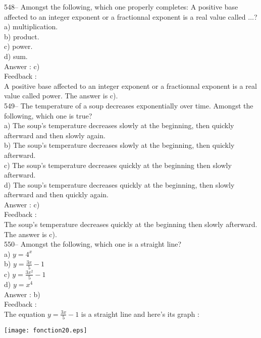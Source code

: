 \documentclass[letterpaper, 12pt]{article}
\begin{document}
548-- Amongst the following, which one properly completes: \og A positive base affected to an integer exponent or a fractionnal exponent is a real value called $\ldots$\fg ?\\
a) multiplication.\\
b) product.\\
c) power.\\
d) sum.\\

Answer : c)\\

Feedback : \\
A positive base affected to an integer exponent or a fractionnal exponent is a real value called power.  The answer is
c).\\

549-- The temperature of a soup decreases exponentially over time. Amongst the following, which one is true?\\
a) The soup's temperature decreases slowly at the beginning, then quickly afterward and then slowly again.\\
b) The soup's temperature decreases slowly at the beginning, then quickly afterward.\\
c) The soup's temperature decreases quickly at the beginning then slowly afterward.\\
d) The soup's temperature decreases quickly at the beginning, then slowly afterward and then quickly again.\\

Answer : c)\\

Feedback : \\
The soup's temperature decreases quickly at the beginning then slowly afterward.  The answer is c).\\

550-- Amongst the following, which one is a straight line?\\
a) $y=4^{x}$\\[2mm]
b) $y=\frac{3x}{5}-1$\\[2mm]
c) $y=\frac{3x^{2}}{5}-1$\\[2mm]
d) $y=x^{4}$\\

Answer : b)\\

Feedback : \\
The equation $y=\frac{3x}{5}-1$ is a straight line and here's its graph : \\
    \begin{center}
    \texttt{[image: fonction20.eps]}
    \end{center}
\end{document}
